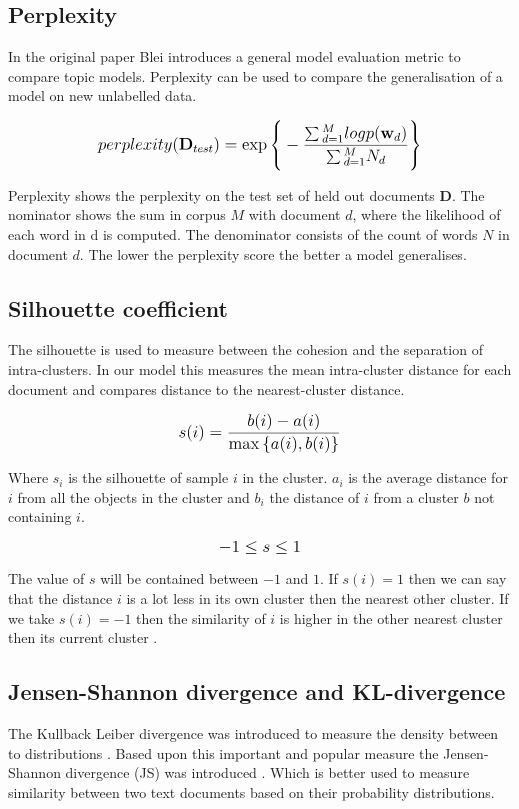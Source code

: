 \subsection{Perplexity}\label{methodology:perplexity}
In the original paper Blei introduces a general model evaluation metric \cite{Blei2003} to compare topic models. Perplexity can be used to compare the generalisation of a model on new unlabelled data.

\[
   \mathlarger{perplexity(\textbf{D}_{test}) = \exp{\Bigg \{ -\frac{\sum{}_{d=1}^{M}logp(\textbf{w}_d)}{\sum{}_{d=1}^{M}N_d} \Bigg \}}}
\]

Perplexity shows the perplexity on the test set of held out documents $\textbf{D}$. The nominator shows the sum in  corpus $M$ with document $d$, where the likelihood of each word in d is computed. The denominator consists of the count of words $N$ in document $d$.
The lower the perplexity score the better a model generalises.


\subsection{Silhouette coefficient} \label{methodology:silhouette}
The silhouette is used to measure between the cohesion and the separation of intra-clusters. In our model this measures the mean intra-cluster distance for each document and compares distance to the nearest-cluster distance.

\[
   \mathlarger{s(i) = \frac{b(i) - a(i)}{\max{\{ a(i), b(i)}\} } }
\]

Where $s_i$ is the silhouette of sample $i$ in the cluster. $a_i$ is the average distance for $i$ from all the objects in the cluster and $b_i$ the distance of $i$ from a cluster $b$ not containing $i$. 

\[
\mathlarger{-1 \leq s \le 1}
\]

The value of $s$ will be contained between $-1$ and $1$. If $s(i) = 1$ then we can say that the distance $i$  is a lot less in its own cluster then the nearest other cluster. If we take $s(i) = -1$ then the similarity of $i$ is higher in the other nearest cluster then its current cluster \cite{Rousseeuw1987Silhouettes:Analysis}.


\subsection{Jensen-Shannon divergence and KL-divergence} \label{methodology:jsdivergence}
The Kullback Leiber divergence was introduced to measure the density between to distributions \cite{Hershey2007ApproximatingModels}. Based upon this important and popular measure the Jensen-Shannon divergence (JS) was introduced \cite{Fuglede2004Jensen-ShannonEmbedding}. Which is better used to measure similarity between two text documents based on their probability distributions.

